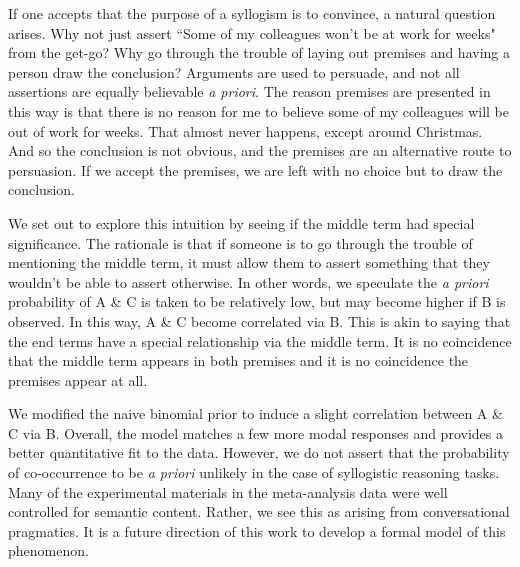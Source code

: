 \documentclass[10pt,letterpaper]{article}
\begin{document}
If one accepts that the purpose of a syllogism is to convince, a natural question arises. Why not just assert ``Some of my colleagues won't be at work for weeks" from the get-go? Why go through the trouble of laying out premises and having a person draw the conclusion? Arguments are used to persuade, and not all assertions are equally believable \emph{a priori}. The reason premises are presented in this way is that there is no reason for me to believe some of my colleagues will be out of work for weeks. That almost never happens, except around Christmas. And so the conclusion is not obvious, and the premises are an alternative route to persuasion. If we accept the premises, we are left with no choice but to draw the conclusion.

We set out to explore this intuition by seeing if the middle term had special significance. The rationale is that if someone is to go through the trouble of mentioning the middle term, it must allow them to assert something that they wouldn't be able to assert otherwise. In other words, we speculate the \emph{a priori} probability of A \& C is taken to be relatively low, but may become higher if B is observed. In this way, A \& C become correlated via B. This is akin to saying that the end terms have a special relationship via the middle term. It is no coincidence that the middle term appears in both premises and it is no coincidence the premises appear at all. 

We modified the naive binomial prior to induce a slight correlation between A \& C via B. Overall, the model matches a few more modal responses and provides a better quantitative fit to the data. However, we do not assert that the probability of co-occurrence to be \emph{a priori} unlikely in the case of syllogistic reasoning tasks. Many of the experimental materials in the meta-analysis data were well controlled for semantic content. Rather, we see this as arising from conversational pragmatics. It is a future direction of this work to develop a formal model of this phenomenon.

\end{document}
